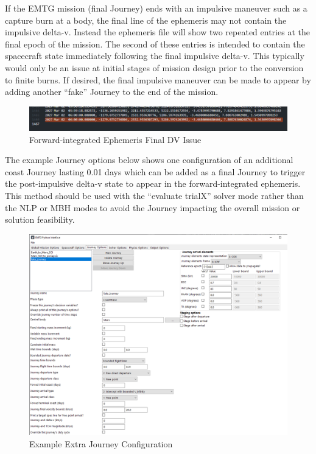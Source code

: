 \begin{alertbox}{}
    \noindent If the \ac{EMTG} mission (final Journey) ends with an impulsive maneuver such as a capture burn at a body, the final line of the ephemeris may not contain the impulsive delta-v. Instead the ephemeris file will show two repeated entries at the final epoch of the mission. The second of these entries is intended to contain the spacecraft state immediately following the final impulsive delta-v. This typically would only be an issue at initial stages of mission design prior to the conversion to finite burns. If desired, the final impulsive maneuver can be made to appear by adding another ``fake'' Journey to the end of the mission. 



    \begin{figure}[H]
        \centering
        \includegraphics[width=0.95\linewidth]{../../shared_latex_inputs/images/ephemeris_dv_bug.png}
        \caption{Forward-integrated Ephemeris Final DV Issue}
    \end{figure}

\noindent The example Journey options below shows one configuration of an additional coast Journey lasting 0.01 days which can be added as a final Journey to trigger the post-impulsive delta-v state to appear in the forward-integrated ephemeris. This method should be used with the ``evaluate trialX'' solver mode rather than the \ac{NLP} or \ac{MBH} modes to avoid the Journey impacting the overall mission or solution feasibility.

    \begin{figure}[H]
        \centering
        \includegraphics[width=0.95\linewidth]{../../shared_latex_inputs/images/extra_journey_options.png}
        \caption{Example Extra Journey Configuration}
    \end{figure}

\end{alertbox}


